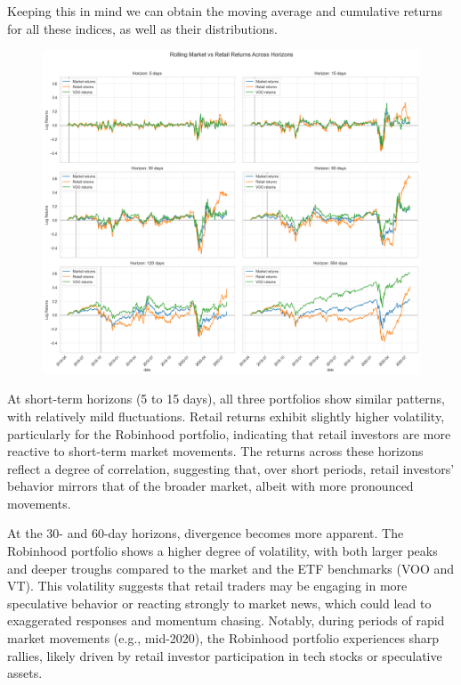 Keeping this in mind we can obtain the moving average and cumulative returns for all these indices, as well as their distributions.

\begin{figure}[h!]
    \centering
    \includegraphics[width=1\linewidth]
    {Images/returns_comparison.png}
    \label{fig:enter-label}
\end{figure}

At short-term horizons (5 to 15 days), all three portfolios show similar patterns, with relatively mild fluctuations. Retail returns exhibit slightly higher volatility, particularly for the Robinhood portfolio, indicating that retail investors are more reactive to short-term market movements. The returns across these horizons reflect a degree of correlation, suggesting that, over short periods, retail investors' behavior mirrors that of the broader market, albeit with more pronounced movements.

At the 30- and 60-day horizons, divergence becomes more apparent. The Robinhood portfolio shows a higher degree of volatility, with both larger peaks and deeper troughs compared to the market and the ETF benchmarks (VOO and VT). This volatility suggests that retail traders may be engaging in more speculative behavior or reacting strongly to market news, which could lead to exaggerated responses and momentum chasing. Notably, during periods of rapid market movements (e.g., mid-2020), the Robinhood portfolio experiences sharp rallies, likely driven by retail investor participation in tech stocks or speculative assets.

